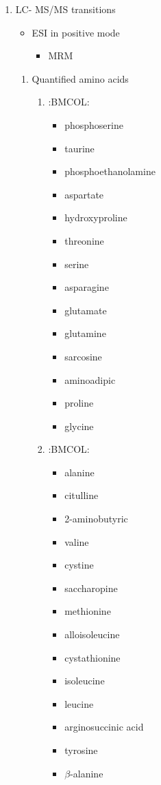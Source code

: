 \documentclass{scrartcl}
\begin{document}
\begin{enumerate}
\item LC- MS/MS transitions
\label{sec:org5f83f78}
\begin{itemize}
\item ESI in positive mode
\begin{itemize}
\item MRM
\end{itemize}
\end{itemize}

\begin{enumerate}
\item Quantified amino acids
\label{sec:orgf416a26}
\scriptsize
\begin{enumerate}
\item :BMCOL:
\label{sec:org48e0399}
\begin{itemize}
\item phosphoserine
\item taurine
\item phosphoethanolamine
\item aspartate
\item hydroxyproline
\item threonine
\item serine
\item asparagine
\item glutamate
\item glutamine
\item sarcosine
\item aminoadipic
\item proline
\item glycine
\end{itemize}

\item :BMCOL:
\label{sec:org422c4f4}
\begin{itemize}
\item alanine
\item citulline
\item 2-aminobutyric
\item valine
\item cystine
\item saccharopine
\item methionine
\item alloisoleucine
\item cystathionine
\item isoleucine
\item leucine
\item arginosuccinic acid
\item tyrosine
\item \(\beta\)-alanine
\end{itemize}


\end{enumerate}
\end{enumerate}
\end{enumerate}
\end{document}
